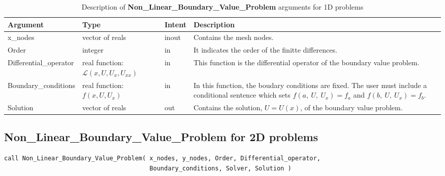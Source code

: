 \begin{table}[H]
	\begin{center}
		\begin{spacing}{1.2}
			\begin{tabular}{| l | p{3cm}| l | p{5cm} |}
				
				\hline
				
				\bf Argument & \bf Type & \bf Intent & \bf Description \\ \hline \hline
				
				x\_nodes & vector of reals & inout &  Contains the mesh nodes.  \\ \hline
				
				Order &  integer  & in & It indicates the order of the finitte differences.  \\ \hline
				
				Differential\_operator & \raggedright real function: $\mathscr{L}\left(x, U,  U_x,  U_{xx} \right)$ & in  & This function is the differential operator of the boundary value problem.   \\ \hline
				
				Boundary\_conditions & \raggedright real function: $f\left(x, U,  U_x \right)$  & in &  In this function, the boudary conditions are fixed. The user must include a conditional sentence which sets $f\left(a,\ U, \ U_x \right) = f_a$ and $f\left(b,\ U, \ U_x \right) = f_b$.  \\ \hline
				
				Solution & vector of reals  & out &  Contains the solution, $U = U(x)$, of the boundary value problem. \\ \hline
				
				
			\end{tabular}
		\end{spacing}
	\end{center}
	\caption{Description of \textbf{Non\_Linear\_Boundary\_Value\_Problem} arguments for 1D problems}
\end{table}


\newpage

\subsection*{Non\_Linear\_Boundary\_Value\_Problem for 2D problems}

\lstset{language=Fortran}
\begin{lstlisting}[frame=trBL]
call Non_Linear_Boundary_Value_Problem( x_nodes, y_nodes, Order, Differential_operator,  
                                        Boundary_conditions, Solver, Solution )
 \end{lstlisting}   

